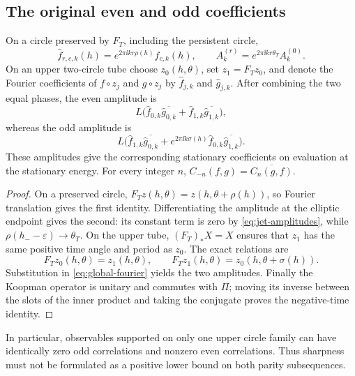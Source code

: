 \subsection{The original even and odd coefficients}

\begin{proposition}\label{prop:parity}
On a circle preserved by \(F_T\), including the persistent circle,
\[
 \widehat f_{r,c,k}(h)=e^{2\pi\ii kr\rho(h)}\widehat f_{c,k}(h),
 \qquad A_k^{(r)}=e^{2\pi\ii kr\theta_T}A_k^{(0)}.
\]
On an upper two-circle tube choose \(z_0(h,\theta)\), set
\(z_1=F_Tz_0\), and denote the Fourier coefficients of \(f\circ z_j\)
and \(g\circ z_j\) by \(\widehat f_{j,k}\) and \(\widehat g_{j,k}\).
After combining the two equal phases, the even amplitude is
\[
 L\bigl(\widehat f_{0,k}\overline{\widehat g_{0,k}}
       +\widehat f_{1,k}\overline{\widehat g_{1,k}}\bigr),
\]
whereas the odd amplitude is
\begin{equation}\label{eq:odd-upper}
 L\bigl(\widehat f_{1,k}\overline{\widehat g_{0,k}}
       +e^{2\pi\ii k\sigma(h)}\widehat f_{0,k}
                                      \overline{\widehat g_{1,k}}\bigr).
\end{equation}
These amplitudes give the corresponding stationary coefficients on
evaluation at the stationary energy. For every integer \(n\),
\(C_{-n}(f,g)=\overline{C_n(g,f)}\).
\end{proposition}

\begin{proof}
On a preserved circle, \(F_Tz(h,\theta)=z(h,\theta+\rho(h))\), so Fourier
translation gives the first identity. Differentiating the amplitude at
the elliptic endpoint gives the second: its constant term is zero by
\eqref{eq:jet-amplitudes}, while \(\rho(h_--\varepsilon)\to\theta_T\).
On the upper tube, \((F_T)_*X=X\) ensures that \(z_1\) has the same
positive time angle and period as \(z_0\). The exact relations are
\[
 F_Tz_0(h,\theta)=z_1(h,\theta),\qquad
 F_Tz_1(h,\theta)=z_0(h,\theta+\sigma(h)).
\]
Substitution in \eqref{eq:global-fourier} yields the two amplitudes.
Finally the Koopman operator is unitary and commutes with \(\Pi\);
moving its inverse between the slots of the inner product and taking
the conjugate proves the negative-time identity.
\end{proof}

In particular, observables supported on only one upper circle family can
have identically zero odd correlations and nonzero even correlations.
Thus sharpness must not be formulated as a positive lower bound on both
parity subsequences.

